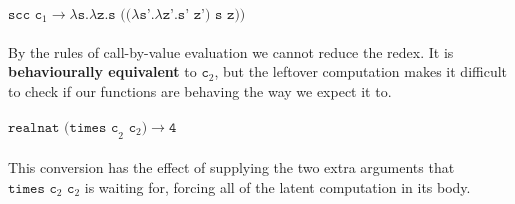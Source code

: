 \documentclass{article}
\begin{document}
\(\texttt{scc c}_{1} \to \lambda \texttt{s.}\lambda \texttt{z.s ((}\lambda \texttt{s'.}\lambda \texttt{z'.s' z') s z))}\)\\\\
By the rules of call-by-value evaluation we cannot reduce the redex. It is \textbf{behaviourally equivalent} to \(\texttt{c}_{2}\), but the leftover computation makes it difficult to check if our functions are behaving the way we expect it to.\\\\
\(\texttt{realnat (times c}_{2} \texttt{ c}_{2} \texttt{)}\to \texttt{4}\)\\\\
This conversion has the effect of supplying the two extra arguments that \(\texttt{times c}_{2} \texttt{ c}_{2}\) is waiting for, forcing all of the latent computation in its body.
\end{document}
